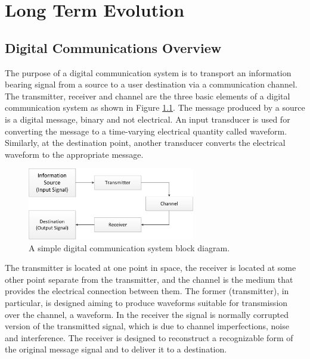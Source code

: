 \chapter{Long Term Evolution}
\label{chap:lte}

\section{Digital Communications Overview}
\label{lte:digicomm}

The purpose of a digital communication system is to transport an information
bearing signal from a source to a user destination via a communication channel.
The transmitter, receiver and channel are the three basic elements of a digital
communication system as shown in Figure \ref{fig:digicomsimple}. The message
produced by a source is a digital message, binary and not electrical. An input
transducer is used for converting the message to a time-varying electrical
quantity called waveform. Similarly, at the destination point, another transducer
converts the electrical waveform to the appropriate message.


\begin{figure}[htbp]
    \centering
    \includegraphics[width=0.65\textwidth]{./figures/digicom_simple}
    \caption{ A simple digital communication system block diagram.
    \label{fig:digicomsimple}}
\end{figure}

The transmitter is located at one point in space, the receiver is located at
some other point separate from the transmitter, and the channel is the medium
that provides the electrical connection between them. The former (transmitter),
in particular, is designed aiming to produce waveforms suitable for transmission
over the channel, a waveform. In the receiver the signal is normally corrupted
version of the transmitted signal, which is due to channel imperfections, noise
and interference. The receiver is designed to reconstruct a recognizable form of
the original message signal and to deliver it to a destination.

